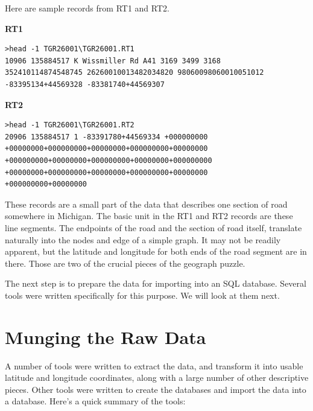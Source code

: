 \documentclass[11pt,letterpaper,onecolumn,twoside,openright,final]{report}
\begin{document}
Here are sample records from RT1 and RT2.

\textbf{RT1}
\begin{verbatim}
>head -1 TGR26001\TGR26001.RT1
10906 135884517 K Wissmiller Rd A41 3169 3499 3168
352410114874548745 26260010013482034820 98060098060010051012
-83395134+44569328 -83381740+44569307
\end{verbatim}

\textbf{RT2}
\begin{verbatim}
>head -1 TGR26001\TGR26001.RT2
20906 135884517 1 -83391780+44569334 +000000000
+00000000+000000000+00000000+000000000+00000000
+000000000+00000000+000000000+00000000+000000000
+00000000+000000000+00000000+000000000+00000000
+000000000+00000000
\end{verbatim}

These records are a small part of the data that describes one section of road somewhere in Michigan.
The basic unit in the RT1 and RT2 records are these line segments.
The endpoints of the road and the section of road itself, translate naturally into the nodes and edge of a simple graph.
It may not be readily apparent, but the latitude and longitude for both ends of the road segment are in there.
Those are two\cite{colu92} of the crucial pieces of the geograph puzzle.

The next step is to prepare the data for importing into an SQL database.
Several tools were written specifically for this purpose.
We will look at them next.

\section{Munging the Raw Data}

A number of tools were written to extract the data, and transform it into usable latitude and longitude coordinates, along with a large number of other descriptive pieces.
Other tools were written to create the databases and import the data into a database.
Here's a quick summary of the tools:
\end{document}
